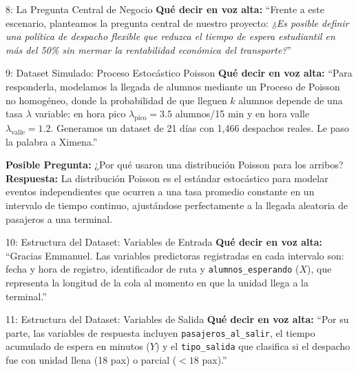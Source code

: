 \documentclass[11pt, a4paper]{article}
\begin{document}
\begin{emmanuelbox}{8: La Pregunta Central de Negocio}
\textbf{Qué decir en voz alta:}
``Frente a este escenario, planteamos la pregunta central de nuestro proyecto: \textit{¿Es posible definir una política de despacho flexible que reduzca el tiempo de espera estudiantil en más del 50\% sin mermar la rentabilidad económica del transporte?}''
\end{emmanuelbox}

\begin{emmanuelbox}{9: Dataset Simulado: Proceso Estocástico Poisson}
\textbf{Qué decir en voz alta:}
``Para responderla, modelamos la llegada de alumnos mediante un Proceso de Poisson no homogéneo, donde la probabilidad de que lleguen $k$ alumnos depende de una tasa $\lambda$ variable: en hora pico $\lambda_{\text{pico}} = 3.5$ alumnos/15 min y en hora valle $\lambda_{\text{valle}} = 1.2$. Generamos un dataset de 21 días con 1,466 despachos reales. Le paso la palabra a Ximena.''

\begin{defensebox}
\textbf{Posible Pregunta:} ¿Por qué usaron una distribución Poisson para los arribos?\\
\textbf{Respuesta:} La distribución Poisson es el estándar estocástico para modelar eventos independientes que ocurren a una tasa promedio constante en un intervalo de tiempo continuo, ajustándose perfectamente a la llegada aleatoria de pasajeros a una terminal.
\end{defensebox}
\end{emmanuelbox}

\begin{ximenabox}{10: Estructura del Dataset: Variables de Entrada}
\textbf{Qué decir en voz alta:}
``Gracias Emmanuel. Las variables predictoras registradas en cada intervalo son: fecha y hora de registro, identificador de ruta y \texttt{alumnos\_esperando} ($X$), que representa la longitud de la cola al momento en que la unidad llega a la terminal.''
\end{ximenabox}

\begin{ximenabox}{11: Estructura del Dataset: Variables de Salida}
\textbf{Qué decir en voz alta:}
``Por su parte, las variables de respuesta incluyen \texttt{pasajeros\_al\_salir}, el tiempo acumulado de espera en minutos ($Y$) y el \texttt{tipo\_salida} que clasifica si el despacho fue con unidad llena (18 pax) o parcial ($<18$ pax).''
\end{ximenabox}
\end{document}

